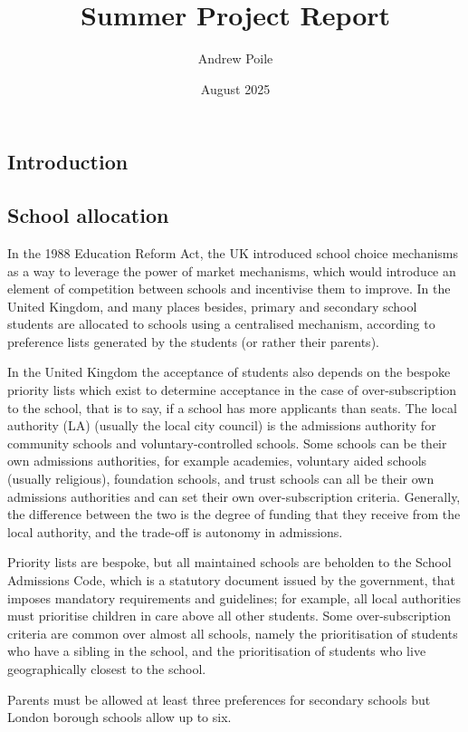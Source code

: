 \documentclass{article}
\title{Summer Project Report}
\author{Andrew Poile}
\date{August 2025}
\begin{document}
\maketitle

\begin{multicols}{2}
\section{Introduction}
\subsection{School allocation}
In the 1988 Education Reform Act, the UK introduced school choice mechanisms as a way to leverage the power of market mechanisms, which would introduce an element of competition between schools and incentivise them to improve. In the United Kingdom, and many places besides, primary and secondary school students are allocated to schools using a centralised mechanism, according to preference lists generated by the students (or rather their parents).

In the United Kingdom the acceptance of students also depends on the bespoke priority lists which exist to determine acceptance in the case of over-subscription to the school, that is to say, if a school has more applicants than seats. The local authority (LA) (usually the local city council) is the admissions authority for community schools and voluntary-controlled schools. Some schools can be their own admissions authorities, for example academies, voluntary aided schools (usually religious), foundation schools, and trust schools can all be their own admissions authorities and can set their own over-subscription criteria. Generally, the difference between the two is the degree of funding that they receive from the local authority, and the trade-off is autonomy in admissions.

Priority lists are bespoke, but all maintained schools are beholden to the School Admissions Code, which is a statutory document issued by the government, that imposes mandatory requirements and guidelines; for example, all local authorities must prioritise children in care above all other students. Some over-subscription criteria are common over almost all schools, namely the prioritisation of students who have a sibling in the school, and the prioritisation of students who live geographically closest to the school.

Parents must be allowed at least three preferences for secondary schools but London borough schools allow up to six. 


\end{multicols}
\end{document}
